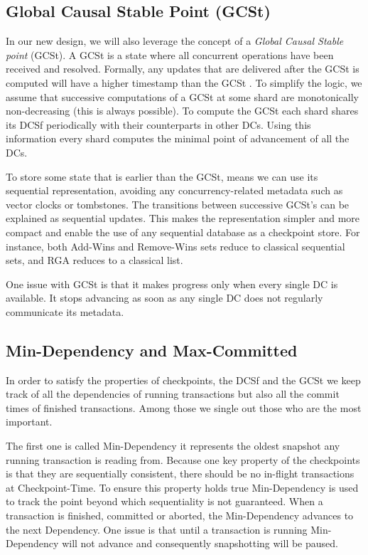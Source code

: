 \documentclass[twoside]{article}
\begin{document}
\subsection{Global Causal Stable Point (GCSt)}
\label{sec:causal-stable-snapshot}

In our new design, we will also leverage the concept of a
\emph{Global Causal Stable point} (GCSt).
A GCSt is a state where all concurrent operations have been received and
resolved.
Formally, any updates that are delivered after the GCSt is computed will
have a higher timestamp than the GCSt
\cite[Definition~5.1]{app:rep:1800}.
To simplify the logic, we assume that successive computations of a GCSt
at some shard are monotonically non-decreasing (this is always
possible).
To compute the GCSt each shard shares its DCSf periodically with their
counterparts in other DCs. 
Using this information every shard computes the minimal point of advancement of
all the DCs. 

To store some state that is earlier than the GCSt, means we can use its
sequential representation, avoiding any concurrency-related metadata such as
vector clocks or tombstones.
The transitions between successive GCSt's can be explained as sequential
updates.
This makes the representation simpler and more compact and enable the 
use of any sequential database as a checkpoint store.
For instance, both Add-Wins and Remove-Wins sets reduce to classical
sequential sets, and RGA reduces to a classical list.

One issue with GCSt is that it makes progress only when every single DC
is available.
It stops advancing as soon as any single DC does not regularly communicate its
metadata.

\subsection{Min-Dependency and Max-Committed}
\label{sec:dep-commit}
In order to satisfy the properties of checkpoints, the DCSf and the GCSt we keep
track of all the dependencies of running transactions but also all the commit
times of finished transactions. 
Among those we single out those who are the most important.

The first one is called Min-Dependency it represents the oldest snapshot any
running transaction is reading from. 
Because one key property of the checkpoints is that they are sequentially
consistent, there should be no in-flight transactions at Checkpoint-Time.
To ensure this property holds true Min-Dependency is used to track the point
beyond which sequentiality is not guaranteed.
When a transaction is finished, committed or aborted, the Min-Dependency
advances to the next Dependency. 
One issue is that until a transaction is running Min-Dependency
will not advance and consequently snapshotting will be paused.
\end{document}
